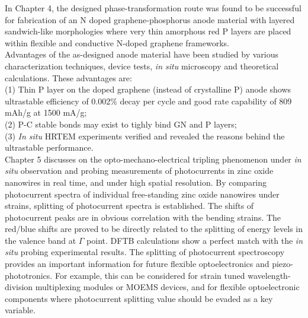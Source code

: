 In Chapter 4, the designed phase-transformation route was found to be successful for fabrication of an N doped graphene-phosphorus anode material with layered sandwich-like morphologies where very thin amorphous red P layers are placed within flexible and conductive N-doped graphene frameworks.\\
Advantages of the as-designed anode material have been studied by various characterization techniques, device tests, {\it in situ} microscopy and theoretical calculations. 
These advantages are: \\
(1) Thin P layer on the doped graphene (instead of crystalline P) anode shows ultrastable efficiency of 0.002\% decay per cycle and good rate capability of 809 mAh/g at 1500 mA/g; \\
(2) P-C stable bonds may exist to tighly bind GN and P layers; \\
(3) {\it In situ} HRTEM experiments verified and revealed the reasons behind the ultrastable performance.\\

Chapter 5 discusses on the opto-mechano-electrical tripling phenomenon under {\it in situ} observation and probing measurements of photocurrents in zinc oxide nanowires in real time, and under high spatial resolution. 
By comparing photocurrent spectra of individual free-standing zinc oxide nanowires under strains, splitting of photocurrent spectra is established. 
The shifts of photocurrent peaks are in obvious correlation with the bending strains. 
The red/blue shifts are proved to be directly related to the splitting of energy levels in the valence band at $\Gamma$ point. 
DFTB calculations show a perfect match with the {\it in situ} probing experimental results. 
The splitting of photocurrent spectroscopy provides an important information for future flexible optoelectronics and piezo-phototronics. 
For example, this can be considered for strain tuned wavelength-division multiplexing modules or MOEMS devices, and for flexible optoelectronic components where photocurrent splitting value should be evaded as a key variable. \\

